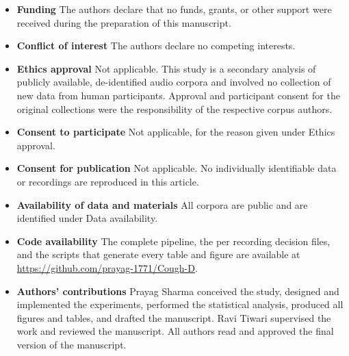 \begin{itemize}
\item \textbf{Funding} \; The authors declare that no funds, grants, or other support
      were received during the preparation of this manuscript.

\item \textbf{Conflict of interest} \; The authors declare no competing interests.

\item \textbf{Ethics approval} \; Not applicable. This study is a secondary analysis of
      publicly available, de-identified audio corpora and involved no collection of new
      data from human participants. Approval and participant consent for the original
      collections were the responsibility of the respective corpus authors.

\item \textbf{Consent to participate} \; Not applicable, for the reason given under
      Ethics approval.

\item \textbf{Consent for publication} \; Not applicable. No individually identifiable
      data or recordings are reproduced in this article.

\item \textbf{Availability of data and materials} \; All corpora are public and are
      identified under Data availability.

\item \textbf{Code availability} \; The complete pipeline, the per recording decision
      files, and the scripts that generate every table and figure are available at
      \url{https://github.com/prayag-1771/Cough-D}.

\item \textbf{Authors' contributions} \; Prayag Sharma conceived the study, designed and
      implemented the experiments, performed the statistical analysis, produced all
      figures and tables, and drafted the manuscript. Ravi Tiwari supervised the work and
      reviewed the manuscript. All authors read and approved the final version of the
      manuscript.
\end{itemize}
